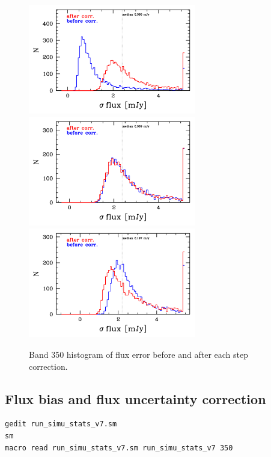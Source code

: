 \documentclass[11pt,a4paper]{article}
\begin{document}
\begin{figure}[H]
	\caption{
		Band 350 histogram of flux error before and after each step correction. 
	}
	\includegraphics[width=0.65\textwidth]{galsim_350_hist_uncertainty_1}
	\includegraphics[width=0.65\textwidth]{galsim_350_hist_uncertainty_2}
	\includegraphics[width=0.65\textwidth]{galsim_350_hist_uncertainty_3}
\end{figure}


\subsection{Flux bias and flux uncertainty correction}
\label{Band350_dfcorr}

\begin{lstlisting}[language=bash]
gedit run_simu_stats_v7.sm
sm
macro read run_simu_stats_v7.sm run_simu_stats_v7 350
\end{lstlisting}
\end{document}
